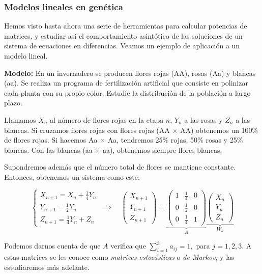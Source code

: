 \subsubsection{Modelos lineales en genética}

Hemos visto hasta ahora una serie de herramientas para calcular potencias de matrices, y estudiar así el comportamiento asintótico de las soluciones de un sistema de ecuaciones en diferencias. Veamos un ejemplo de aplicación a un modelo lineal.

\textbf{Modelo:} En un invernadero se producen flores rojas (AA), rosas (Aa) y blancas (aa). Se
realiza un programa de fertilización artificial que consiste en polinizar cada
planta con su propio color. Estudie la distribución de la población a largo
plazo.

Llamamos $X_n$ al número de flores rojas en la etapa $n$, $Y_n$ a las rosas y $Z_n$ a
las blancas. Si cruzamos flores rojas con flores rojas (AA $\times$ AA) obtenemos
un 100\% de flores rojas. Si hacemos Aa $\times$ Aa, tendremos 25\% rojas, 50\% rosas y
25\% blancas. Con las blancas (aa $\times$ aa), obtenemos siempre flores blancas.

Supondremos además que el número total de flores se mantiene constante. Entonces, obtenemos un sistema como este:

$$
\begin{cases}
  X_{n+1} = X_n + \frac{1}{4}Y_n \\
  Y_{n+1} = \frac{1}{2}Y_n \\
  Z_{n+1} = \frac{1}{4}Y_n + Z_n
\end{cases} \implies \quad \begin{pmatrix}
  X_{n+1} \\
  Y_{n+1} \\
  Z_{n+1}
\end{pmatrix} =
\underbrace{\begin{pmatrix}
  1 & \frac{1}{4} & 0 \\
  0 & \frac{1}{2} & 0 \\
  0 & \frac{1}{4} & 1
\end{pmatrix}}_A
\underbrace{\begin{pmatrix}
  X_n \\
  Y_n \\
  Z_n
\end{pmatrix}}_{W_n}$$

\begin{nota}
	Podemos darnos cuenta de que $A$ verifica que $\sum_{i=1}^3 a_{ij} = 1,$ para $j=1,2,3$. A estas matrices se les conoce como \textit{matrices estocásticas} o \textit{de Markov}, y las estudiaremos más adelante.
\end{nota}

